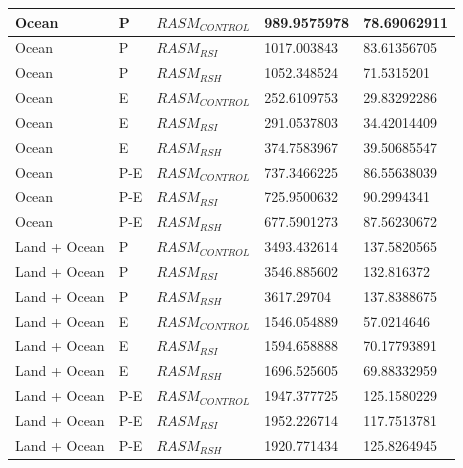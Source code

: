 \documentclass[draft]{agujournal}
\begin{document}
\begin{table}[]
{\begin{tabular}{|l|l|l|l|l|}
Ocean         & P                 & $RASM_{CONTROL}$    & 989.9575978         & 78.69062911           \\ \hline
Ocean         & P                 & $RASM_{RSI}$        & 1017.003843         & 83.61356705           \\ \hline
Ocean         & P                 & $RASM_{RSH}$        & 1052.348524         & 71.5315201            \\ \hline
Ocean         & E                 & $RASM_{CONTROL}$    & 252.6109753         & 29.83292286           \\ \hline
Ocean         & E                 & $RASM_{RSI}$        & 291.0537803         & 34.42014409           \\ \hline
Ocean         & E                 & $RASM_{RSH}$        & 374.7583967         & 39.50685547           \\ \hline
Ocean         & P-E               & $RASM_{CONTROL}$    & 737.3466225         & 86.55638039           \\ \hline
Ocean         & P-E               & $RASM_{RSI}$        & 725.9500632         & 90.2994341            \\ \hline
Ocean         & P-E               & $RASM_{RSH}$        & 677.5901273         & 87.56230672           \\ \hline
Land + Ocean  & P                 & $RASM_{CONTROL}$    & 3493.432614         & 137.5820565           \\ \hline
Land + Ocean  & P                 & $RASM_{RSI}$        & 3546.885602         & 132.816372            \\ \hline
Land + Ocean  & P                 & $RASM_{RSH}$        & 3617.29704          & 137.8388675           \\ \hline
Land + Ocean  & E                 & $RASM_{CONTROL}$    & 1546.054889         & 57.0214646            \\ \hline
Land + Ocean  & E                 & $RASM_{RSI}$        & 1594.658888         & 70.17793891           \\ \hline
Land + Ocean  & E                 & $RASM_{RSH}$        & 1696.525605         & 69.88332959           \\ \hline
Land + Ocean  & P-E               & $RASM_{CONTROL}$    & 1947.377725         & 125.1580229           \\ \hline
Land + Ocean  & P-E               & $RASM_{RSI}$        & 1952.226714         & 117.7513781           \\ \hline
Land + Ocean  & P-E               & $RASM_{RSH}$        & 1920.771434         & 125.8264945           \\ \hline
\end{tabular}
}
\end{table}
\end{document}
